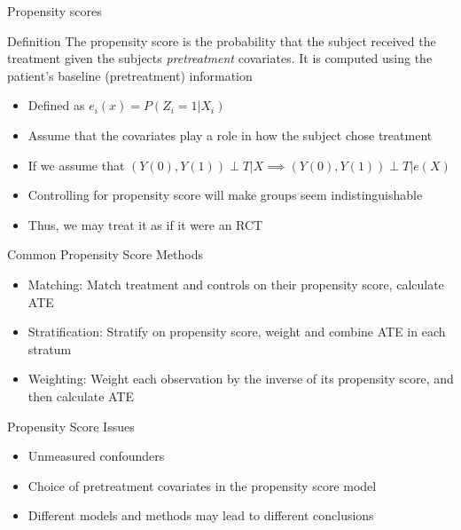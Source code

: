 \begin{frame}{Propensity scores}
\begin{block}{Definition}
The propensity score is the probability that the subject received the treatment given the subjects \textit{pretreatment}
covariates. It is computed using the patient's baseline (pretreatment) information \cite{Rosenbaum1983}
\end{block}
 \begin{itemize}
  \item Defined as  $e_i(x)=P(Z_i =1 |X_i)$
  \item Assume that the covariates play a role in how the subject chose treatment
  \item If we assume that $(Y(0),Y(1))\perp T|X \implies (Y(0),Y(1))\perp T|e(X)$
  \item Controlling for propensity score will make groups seem indistinguishable
  \item Thus, we may treat it as if it were an RCT
 \end{itemize}

\end{frame}

\begin{frame}{Common Propensity Score Methods}
\begin{itemize}
 \item Matching: Match treatment and controls on their propensity score, calculate ATE
 \item Stratification: Stratify on propensity score, weight and combine ATE in each stratum
 \item Weighting: Weight each observation by the inverse of its propensity score, and then calculate ATE
\end{itemize}
\end{frame}

\begin{frame}{Propensity Score Issues}
 \begin{itemize}
  \item Unmeasured confounders
  \item Choice of pretreatment covariates in the propensity score model
  \item Different models and methods may lead to different conclusions
 \end{itemize}

\end{frame}
